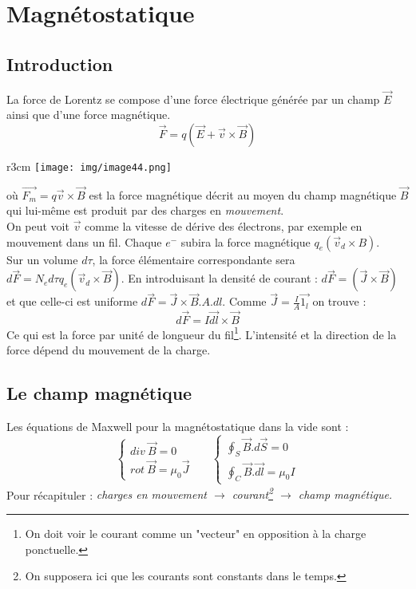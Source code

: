 \documentclass	[11pt, a4paper, openany]{book}
\begin{document}
\chapter{Magnétostatique}
\section{Introduction}
La force de Lorentz se compose d'une force électrique générée par un champ $\vec{E}$ ainsi que d'une force magnétique.
\begin{equation}
\vec{F} = q(\vec{E} + \vec{v}\times\vec{B})
\end{equation}
\begin{wrapfigure}[9]{r}{3cm}
\texttt{[image: img/image44.png]}
\end{wrapfigure}
où $\vec{F_m} = q\vec{v}\times\vec{B}$ est la force magnétique décrit au moyen du champ magnétique $\vec{B}$ qui lui-même est produit par des charges en \textit{mouvement}.\\
On peut voit $\vec{v}$ comme la vitesse de dérive des électrons, par exemple en mouvement dans un fil. Chaque $e^-$ subira la force magnétique $q_e(\vec{v}_d \times B)$.\\
Sur un volume $d\tau$, la force élémentaire correspondante sera $d\vec{F} = N_ed\tau q_e(\vec{v}_d\times\vec{B})$. En introduisant la densité de courant : $d\vec{F} = (\vec{J}\times\vec{B})$ et que celle-ci est uniforme $d\vec{F} = \vec{J}\times\vec{B}.A.dl$. Comme $\vec{J} = \frac{I}{A}\vec{1_l}$ on trouve :
\begin{equation}
d\vec{F} = I \vec{dl}\times \vec{B}
\end{equation}
Ce qui est la force par unité de longueur du fil\footnote{On doit voir le courant comme un "vecteur" en opposition à la charge ponctuelle.}. 
L'intensité et la direction de la force dépend du mouvement de la charge.

\section{Le champ magnétique}
Les équations de Maxwell pour la magnétostatique dans la vide sont :
\begin{equation}
\left\{\begin{array}{l}
div\ \vec{B} = 0\\
rot\ \vec{B} = \mu_0\vec{J}
\end{array}\right.\ \ \ \ \ \ \ \left\{\begin{array}{l}
\oint_S \vec{B}.d\vec{S} = 0\\
\oint_C \vec{B}.\vec{dl} = \mu_0I
\end{array}\right.
\end{equation}
Pour récapituler : \textit{charges en mouvement $\rightarrow$ courant\footnote{On supposera ici que les courants sont constants dans le temps.} $\rightarrow$ champ magnétique.}\\
\end{document}
